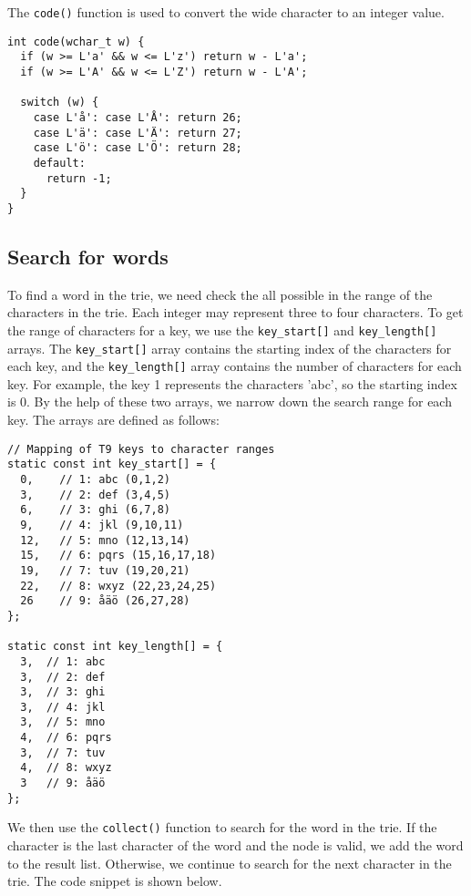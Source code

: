 \documentclass[a4paper,11pt]{article}
\begin{document}
The {\tt code()} function is used to convert the wide character to an integer value.

\begin{verbatim}
int code(wchar_t w) {
  if (w >= L'a' && w <= L'z') return w - L'a';
  if (w >= L'A' && w <= L'Z') return w - L'A';
  
  switch (w) {
    case L'å': case L'Å': return 26;
    case L'ä': case L'Ä': return 27;
    case L'ö': case L'Ö': return 28;
    default:
      return -1;
  }
}
\end{verbatim}

\subsection*{Search for words}

To find a word in the trie, we need check the all possible in the range of the characters in the trie.
Each integer may represent three to four characters. To get the range of characters for a key,
we use the {\tt key\_start[]} and {\tt key\_length[]} arrays. The {\tt key\_start[]} array contains 
the starting index of the characters for each key, and the {\tt key\_length[]} array contains the number of 
characters for each key. For example, the key 1 represents the characters 'abc', so the starting index is 0.
By the help of these two arrays, we narrow down the search range for each key.
The arrays are defined as follows:

\begin{verbatim}
// Mapping of T9 keys to character ranges
static const int key_start[] = {
  0,    // 1: abc (0,1,2)
  3,    // 2: def (3,4,5)
  6,    // 3: ghi (6,7,8)
  9,    // 4: jkl (9,10,11)
  12,   // 5: mno (12,13,14)
  15,   // 6: pqrs (15,16,17,18)
  19,   // 7: tuv (19,20,21)
  22,   // 8: wxyz (22,23,24,25)
  26    // 9: åäö (26,27,28)
};

static const int key_length[] = {
  3,  // 1: abc
  3,  // 2: def
  3,  // 3: ghi
  3,  // 4: jkl
  3,  // 5: mno
  4,  // 6: pqrs
  3,  // 7: tuv
  4,  // 8: wxyz
  3   // 9: åäö
};
\end{verbatim}

We then use the {\tt collect()} function to search for the word in the trie.
If the character is the last character of the word and the node is valid, we add the word to the result list.
Otherwise, we continue to search for the next character in the trie. The code snippet is shown below.
\end{document}
